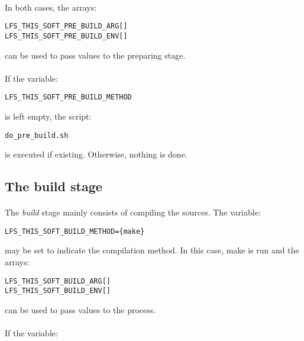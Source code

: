 \documentclass[a4paper, 11pt]{article}
\begin{document}
\paragraph{}
In both cases, the arrays:\\

\begin{lstlisting}[frame=tb]
LFS_THIS_SOFT_PRE_BUILD_ARG[]
LFS_THIS_SOFT_PRE_BUILD_ENV[]
\end{lstlisting}
can be used to pass values to the preparing stage.

\paragraph{}
If the variable:\\

\begin{lstlisting}[frame=tb]
LFS_THIS_SOFT_PRE_BUILD_METHOD
\end{lstlisting}
is left empty, the script:\\
\begin{lstlisting}[frame=tb]
do_pre_build.sh
\end{lstlisting}
is executed if existing. Otherwise, nothing is done.

\subsection{The build stage}
\paragraph{}
The \textit{build} stage mainly consists of compiling the sources. The variable:\\

\begin{lstlisting}[frame=tb]
LFS_THIS_SOFT_BUILD_METHOD={make}
\end{lstlisting}
may be set to indicate the compilation method. In this case, make is run and the
arrays:\\

\begin{lstlisting}[frame=tb]
LFS_THIS_SOFT_BUILD_ARG[]
LFS_THIS_SOFT_BUILD_ENV[]
\end{lstlisting}
can be used to pass values to the process.

\paragraph{}
If the variable:\\
\end{document}

